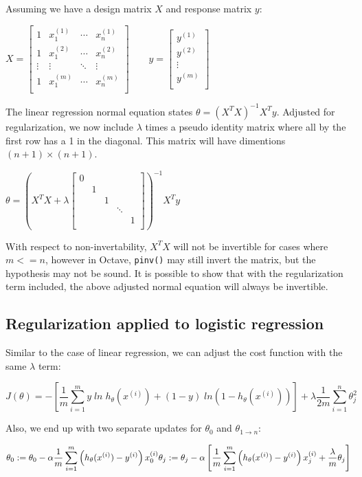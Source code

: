 \documentclass[11pt]{article}
\begin{document}
Assuming we have a design matrix \(X\) and response matrix \(y\):

\( \displaystyle
X =
\begin{bmatrix}
1 & x^{(1)}_1 &  \cdots & x^{(1)}_n \\
1 & x^{(2)}_1 &  \cdots & x^{(2)}_n \\
\vdots & \vdots & \ddots & \vdots \\
1 & x^{(m)}_1 &  \cdots & x^{(m)}_n \\
\end{bmatrix} \qquad
y = 
\begin{bmatrix}
y^{(1)} \\
y^{(2)} \\
\vdots \\
y^{(m)} \\
\end{bmatrix}
\)

The linear regression normal equation states \( \displaystyle \theta = \left( X^T X
\right)^{-1} X^T y \). Adjusted for regularization, we now include \(\lambda\) times
a pseudo identity matrix where all by the first row has a 1 in the diagonal. This
matrix will have dimentions \((n+1) \times (n+1)\).

\( \displaystyle
\theta = \left( X^T X + \lambda
\begin{bmatrix}
0 & & & & \\
& 1 & & & \\
& & 1 & & \\
& & & \ddots & \\
& & & & 1 \\
\end{bmatrix}
\right )^{-1} X^T y
\)

With respect to non-invertability, \(X^T X\) will not be invertible for cases where
\( m <= n \), however in Octave, \texttt{pinv()} may still invert the matrix, but the
hypothesis may not be sound. It is possible to show that with the regularization term
included, the above adjusted normal equation will always be invertible.
\subsection{Regularization applied to logistic regression}
\label{sec-4-3}

Similar to the case of linear regression, we can adjust the cost function with the
same \( \lambda \) term:

\[
J(\theta) = - \left[ \frac{1}{m} \sum_{i=1}^m y \; ln \; h_\theta(x^{(i)}) + (1-y) \;
ln(1-h_\theta(x^{(i)})) \right] + \lambda \frac{1}{2m} \sum_{i=1}^n \theta^2_j
\]

Also, we end up with two separate updates for \( \theta_0 \) and \( \theta_{1
\rightarrow n} \):

\( \displaystyle
\theta_0 := \theta_0 - \alpha \frac{1}{m} \sum_{i=1}^m \left( h_\theta(x^{(i)}) -
y^{(i)} \right)x^{(i)}_0 \\
\theta_j := \theta_j - \alpha \left[ \frac{1}{m} \sum_{i=1}^m \left( h_\theta(x^{(i)}) -
y^{(i)} \right)x^{(i)}_j + \frac{\lambda}{m} \theta_j \right]
\)
\end{document}
